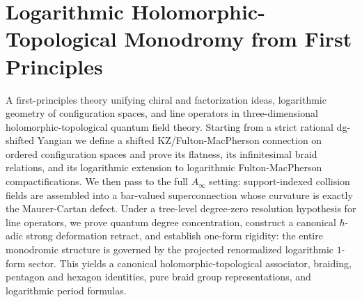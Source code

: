 

\providecommand{\A}{\mathcal A}
\providecommand{\B}{\mathcal B}
\providecommand{\C}{\mathcal C}
\providecommand{\D}{\mathcal D}
\providecommand{\E}{\mathcal E}
\providecommand{\F}{\mathcal F}
\providecommand{\FM}{\mathrm{FM}}
\providecommand{\Conf}{\mathrm{Conf}}
\providecommand{\HT}{\mathrm{HT}}
\providecommand{\MC}{\mathrm{MC}}
\providecommand{\End}{\mathrm{End}}
\providecommand{\Hom}{\mathrm{Hom}}
\providecommand{\id}{\mathrm{id}}
\providecommand{\im}{\mathrm{im}}
\providecommand{\Res}{\mathrm{Res}}
\providecommand{\Aut}{\mathrm{Aut}}
\providecommand{\PP}{\mathbb P}
\providecommand{\AA}{\mathbb A}
\providecommand{\CC}{\mathbb C}
\providecommand{\RR}{\mathbb R}
\providecommand{\ZZ}{\mathbb Z}
\providecommand{\kk}{\Bbbk}
\providecommand{\h}{\hbar}
\providecommand{\ot}{\otimes}
\providecommand{\wot}{\widehat\otimes}
\providecommand{\s}{\mathrm s}
\providecommand{\ds}{d_{\mathrm{dR}}}
\providecommand{\CYB}{\mathrm{CYB}}
\providecommand{\PT}{\mathrm{PT}}
\providecommand{\Disk}{\mathrm{Disk}}
\providecommand{\SN}{\boldsymbol{\nabla}}
\providecommand{\bboxprod}{\mathop{\boxtimes}\displaylimits}


\chapter{Logarithmic Holomorphic-Topological Monodromy from First Principles}
\label{chap:log-ht-monodromy-standalone}

\begin{summary}
A first-principles theory unifying chiral and factorization ideas, logarithmic geometry of configuration spaces, and line operators in three-dimensional holomorphic-topological quantum field theory. Starting from a strict rational dg-shifted Yangian we define a shifted KZ/Fulton-MacPherson connection on ordered configuration spaces and prove its flatness, its infinitesimal braid relations, and its logarithmic extension to logarithmic Fulton-MacPherson compactifications. We then pass to the full $A_\infty$ setting: support-indexed collision fields are assembled into a bar-valued superconnection whose curvature is exactly the Maurer-Cartan defect. Under a tree-level degree-zero resolution hypothesis for line operators, we prove quantum degree concentration, construct a canonical $\h$-adic strong deformation retract, and establish one-form rigidity: the entire monodromic structure is governed by the projected renormalized logarithmic $1$-form sector. This yields a canonical holomorphic-topological associator, braiding, pentagon and hexagon identities, pure braid group representations, and logarithmic period formulas.
\end{summary}

